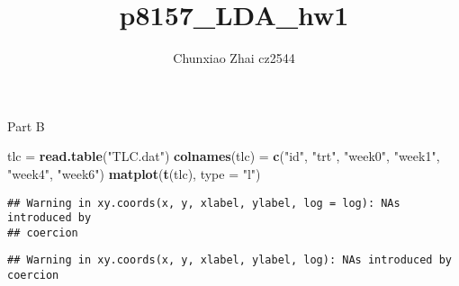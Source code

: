 \documentclass[]{article}
\title{p8157\_LDA\_hw1}
\author{Chunxiao Zhai cz2544}
\date{}
\newenvironment{Shaded}{\begin{snugshade}}{\end{snugshade}}
\newcommand{\DataTypeTok}[1]{\textcolor[rgb]{0.13,0.29,0.53}{#1}}
\newcommand{\KeywordTok}[1]{\textcolor[rgb]{0.13,0.29,0.53}{\textbf{#1}}}
\newcommand{\NormalTok}[1]{#1}
\newcommand{\StringTok}[1]{\textcolor[rgb]{0.31,0.60,0.02}{#1}}
\begin{document}
\maketitle

Part B

\begin{Shaded}
\begin{Highlighting}[]
\NormalTok{tlc =}\StringTok{ }\KeywordTok{read.table}\NormalTok{(}\StringTok{"TLC.dat"}\NormalTok{)}
\KeywordTok{colnames}\NormalTok{(tlc) =}\StringTok{ }\KeywordTok{c}\NormalTok{(}\StringTok{"id"}\NormalTok{, }\StringTok{"trt"}\NormalTok{, }\StringTok{"week0"}\NormalTok{, }\StringTok{"week1"}\NormalTok{, }\StringTok{"week4"}\NormalTok{, }\StringTok{"week6"}\NormalTok{)}
\KeywordTok{matplot}\NormalTok{(}\KeywordTok{t}\NormalTok{(tlc), }\DataTypeTok{type =} \StringTok{"l"}\NormalTok{)}
\end{Highlighting}
\end{Shaded}

\begin{verbatim}
## Warning in xy.coords(x, y, xlabel, ylabel, log = log): NAs introduced by
## coercion
\end{verbatim}

\begin{verbatim}
## Warning in xy.coords(x, y, xlabel, ylabel, log): NAs introduced by coercion
\end{verbatim}
\end{document}
